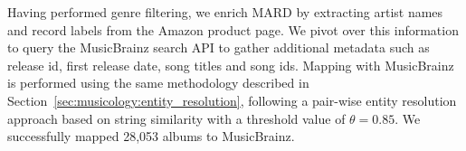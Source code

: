 Having performed genre filtering, we enrich MARD by extracting artist names and record labels from the Amazon product page. We pivot over this information to query the MusicBrainz search API to gather additional metadata such as release id, first release date, song titles and song ids. Mapping with MusicBrainz is performed using the same methodology described in Section~\ref{sec:musicology:entity_resolution}, following a pair-wise entity resolution approach based on string similarity with a threshold value of $\theta=0.85$. We successfully mapped 28,053 albums to MusicBrainz. %







